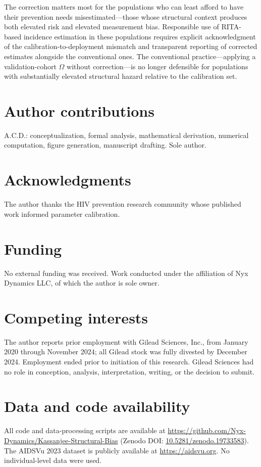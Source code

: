 \documentclass[11pt]{article}
\begin{document}
The correction matters most for the populations who can least afford to have their prevention needs misestimated---those whose structural context produces both elevated risk and elevated measurement bias. Responsible use of RITA-based incidence estimation in these populations requires explicit acknowledgment of the calibration-to-deployment mismatch and transparent reporting of corrected estimates alongside the conventional ones. The conventional practice---applying a validation-cohort $\Omega$ without correction---is no longer defensible for populations with substantially elevated structural hazard relative to the calibration set.

\section*{Author contributions}
A.C.D.: conceptualization, formal analysis, mathematical derivation, numerical computation, figure generation, manuscript drafting. Sole author.

\section*{Acknowledgments}
The author thanks the HIV prevention research community whose published work informed parameter calibration.

\section*{Funding}
No external funding was received. Work conducted under the affiliation of Nyx Dynamics LLC, of which the author is sole owner.

\section*{Competing interests}
The author reports prior employment with Gilead Sciences, Inc., from January 2020 through November 2024; all Gilead stock was fully divested by December 2024. Employment ended prior to initiation of this research. Gilead Sciences had no role in conception, analysis, interpretation, writing, or the decision to submit.

\section*{Data and code availability}
All code and data-processing scripts are available at \url{https://github.com/Nyx-Dynamics/Kassanjee-Structural-Bias} (Zenodo DOI: \href{https://doi.org/10.5281/zenodo.19733583}{10.5281/zenodo.19733583}). The AIDSVu 2023 dataset is publicly available at \url{https://aidsvu.org}. No individual-level data were used.
\end{document}
